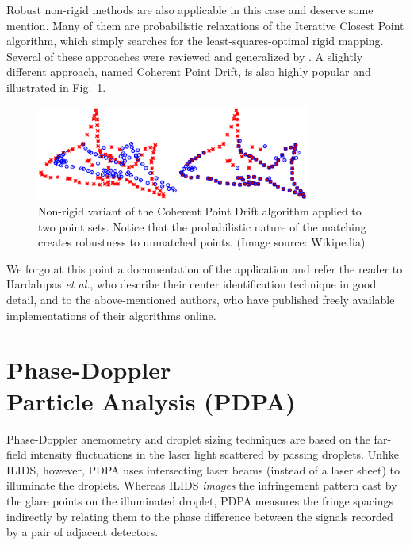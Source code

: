 \documentclass[11.5pt,oneside]{book}
\newcommand*{\figref}[1]{Fig.~\ref{#1}}
\begin{document}
Robust non-rigid methods are also applicable in this case and deserve some
mention. Many of them are probabilistic relaxations of the Iterative Closest
Point algorithm, which simply searches for the least-squares-optimal rigid
mapping. Several of these approaches were reviewed and generalized by
\citet{Jian10}. A slightly different approach, named Coherent Point
Drift\cite{Myronenko10}, is also highly popular and illustrated in \figref{fig:cpd}.
\begin{figure}
    \centering
    \includegraphics[width=0.8\textwidth]{img/orb/pointset.eps}
    \caption{Non-rigid variant of the Coherent Point Drift algorithm applied to
    two point sets. Notice that the probabilistic nature of the matching creates
robustness to unmatched points. (Image source: Wikipedia)}
    \label{fig:cpd}
\end{figure}

We forgo at this point a documentation of the application and refer the reader to
Hardalupas \emph{et al.}, who describe their center identification technique in
good detail, and to the above-mentioned authors, who have published freely
available implementations of their algorithms online.


\chapter[Phase-Doppler Particle Analysis]{Phase-Doppler\\Particle Analysis (PDPA)}
Phase-Doppler anemometry and droplet sizing techniques are based on the
far-field intensity fluctuations in the laser light scattered by passing
droplets. Unlike ILIDS, however, PDPA uses intersecting laser beams (instead of
a laser sheet) to illuminate the droplets. Whereas ILIDS \emph{images} the
infringement pattern cast by the glare points on the illuminated droplet, PDPA
measures the fringe spacings indirectly by relating them to the phase difference 
between the signals recorded by a pair of adjacent detectors. 
\end{document}
